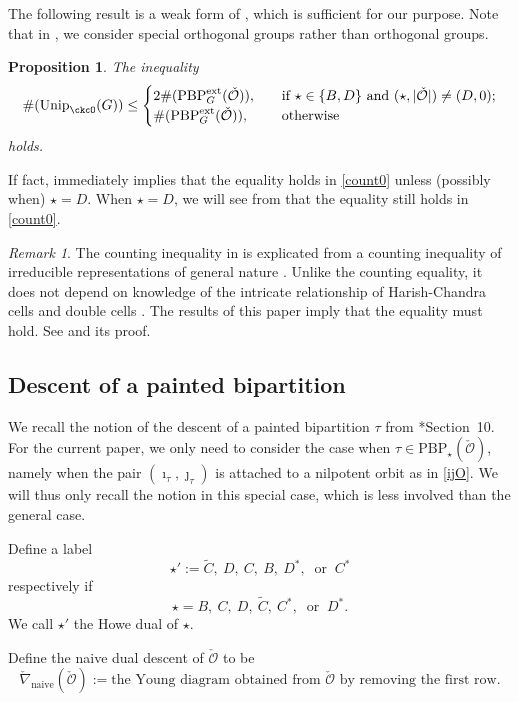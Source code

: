 \documentclass[11pt,a4paper]{amsart}
\newcommand{\CO}{{\mathcal {O}}}
\newcommand{\be}{\begin {equation}}
\newcommand{\ee}{\end {equation}}
\numberwithin{equation}{section}
\newtheorem{prop}[thm]{Proposition}
\theoremstyle{remark}
\newtheorem*{remark}{Remark}
\def\Unip{\mathrm{Unip}}
\begin{document}
The following result is a weak form of \cite[Theorem 2.28]{BMSZa}, which is sufficient for our purpose. Note that in \cite{BMSZa}, we consider special orthogonal groups rather than orthogonal groups.

\begin{prop}\label{thmcount}
The inequality
\be\label{count0}
 \#(\Unip_{\ckcO}(G))\leq \begin{cases}
2  \#(\mathrm{PBP}^{\mathrm{ext}}_G(\check \CO)),&\quad  \text{if  $\star\in \{B,D\}$ and $(\star, |\check \CO|)\neq (D, 0)$;}\\
 \#(\mathrm{PBP}^{\mathrm{ext}}_G(\check \CO)),  &\quad  \text{otherwise }\\
\end{cases}
\ee
holds.
\end{prop}
If fact, \cite[Theorem 2.28]{BMSZa} immediately implies that the equality holds in \eqref{count0} unless (possibly when) $\star=D$. When $\star=D$, we will see from  that the  equality still holds in \eqref{count0}.

\begin{remark} The counting inequality in  is explicated from a counting inequality of irreducible representations of general nature \cite[Corollary 5.4]{BMSZa}. Unlike the counting equality, it does not depend on knowledge of the intricate relationship of Harish-Chandra cells and double cells \cite[Section 4.5]{BMSZa}. The results of this paper imply that the equality must hold. See  and its proof.
\end{remark}


\subsection{Descent of a painted bipartition}
\label{sec:desc}
We recall the notion of the descent of a painted bipartition $\tau$ from \cite{BMSZa}*{Section~10}.
For the current paper, we only need to consider the case when $\tau\in \mathrm{PBP}_\star(\check \CO)$, namely when the pair $(\imath_\tau, \jmath_\tau)$ is attached to a nilpotent orbit as in \eqref{ijO}.
 We will thus only recall the notion in this special case, which is less involved than the general case.


Define a label
\[
\star':=\widetilde{C}, \ D, \  C, \ B, \ D^*,\  \textrm{ or } \ C^*
\]
respectively if
\[
\star=B,\  C, \ D, \ \widetilde{C}, \ C^*, \ \textrm{ or }\  D^*.
\]
We call $\star'$ the Howe dual of $\star$.

 Define the naive dual descent of $\check \CO$ to be
 \[
  \check \nabla_{\mathrm{naive}}(\check \CO):= \textrm{the Young diagram obtained from $\check \CO$ by removing the first row}.
  \]
\end{document}
